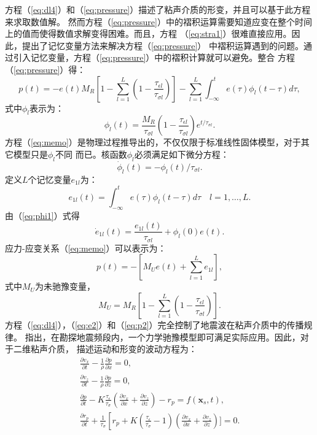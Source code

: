 方程（\ref{eq:dl4}）和（\ref{eq:pressure}）描述了粘声介质的形变，并且可以基于此方程来求取数值解。
然而方程（\ref{eq:pressure}）中的褶积运算需要知道应变在整个时间上的值而使得数值求解变得困难。而且，方程
（\ref{eq:stra1}）很难直接应用。因此，提出了记忆变量方法来解决方程（\ref{eq:pressure}）
中褶积运算遇到的问题。通过引入记忆变量，方程（\ref{eq:pressure}）中的褶积计算就可以避免。整合
方程（\ref{eq:pressure}）得：
\begin{equation}
	p(t)=-e(t)M_R[1-\sum_{l=1}^L(1-\frac{\tau_{\epsilon l}}{\tau_{\sigma l}})]-
	\sum_{l=1}^L\int_{-\infty}^{t}e(\tau)\phi_l(t-\tau)d\tau,
	\label{eq:memo}
\end{equation}
式中$\phi_l$表示为：
\begin{equation}
	\phi_l(t)=\frac{M_R}{\tau_{\sigma l}}(1-\frac{\tau_{\epsilon l}}{\tau_{\sigma l}})e^{t/\tau_{\sigma l}}.
	\label{eq:phi1}
\end{equation}
方程（\ref{eq:memo}）是物理过程推导出的，不仅仅限于标准线性固体模型，对于其它模型只是$\phi_l$不同
而已。核函数$\phi_l$必须满足如下微分方程：
\begin{equation}
	\dot{\phi}_l(t)=-\phi_l(t)/\tau_{\sigma l}.
	\label{eq:phi2}
\end{equation}
定义$L$个记忆变量$e_{1l}$为：
\begin{equation}
	e_{1l}(t)=\int^t_{-\infty}e(\tau)\phi_l(t-\tau)d\tau \quad l=1,\dots,L.
\end{equation}
由（\ref{eq:phi1}）式得
\begin{equation}
	\dot{e}_{1l}(t)=\frac{e_{1l}(t)}{\tau_{\sigma l}}+\phi_l(0)e(t).
	\label{eq:e2}
\end{equation}
应力-应变关系（\ref{eq:memo}）可以表示为：
\begin{equation}
	p(t)=-[M_Ue(t)+\sum_{l=1}^Le_{1l}],
	\label{eq:p2}
\end{equation}
式中$M_U$为未驰豫变量，
\begin{equation}
	M_U=M_R[1-\sum_{l=1}^L(1-\frac{\tau_{\epsilon l}}{\tau_{\sigma l}})].
\end{equation}
方程（\ref{eq:dl4}），（\ref{eq:e2}）和（\ref{eq:p2}）完全控制了地震波在粘声介质中的传播规律。
 指出，在勘探地震频段内，一个力学驰豫模型即可满足实际应用。因此，对于二维粘声介质，
描述运动和形变的波动方程为：
\begin{equation}
    \begin{aligned}
    \label{eq:visco}
    \frac{\partial v_x}{\partial t} - \frac{1}{\rho}\frac{\partial p}{\partial x}=0,\\
    \frac{\partial v_z}{\partial t} - \frac{1}{\rho}\frac{\partial p}{\partial z}=0,\\
    \frac{\partial p}{\partial t} -
    K\frac{\tau_\epsilon}{\tau_\sigma}(\frac{\partial v_x}{\partial x}+\frac{\partial v_z}{\partial z})-r_p=f(\mathbf{x}_s,t),
    \\
    \frac{\partial{r_p}}{\partial t} +
    \frac{1}{\tau_\sigma}\left[r_p+K(\frac{\tau_\epsilon}{\tau_\sigma}-1)
	(\frac{\partial v_x}{\partial x}+\frac{\partial v_z}{\partial z})]=0.
    \end{aligned}
\end{equation}

